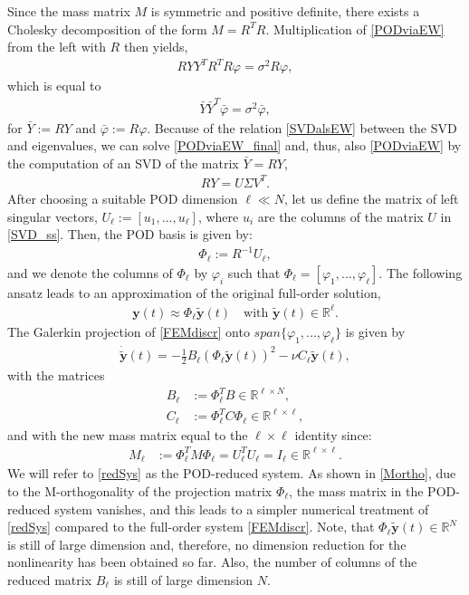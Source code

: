 Since the mass matrix $M$ is symmetric and positive definite, there exists a Cholesky decomposition of the form $M = R^T R$. Multiplication of \eqref{PODviaEW} from the left with $R$ then yields,
\begin{align*}
R Y Y^T R^T R \varphi = \sigma^2 R \varphi,
\end{align*}
which is equal to
\begin{align}
\label{PODviaEW_final}
\bar{Y} \bar{Y}^T \bar{\varphi} = \sigma^2 \bar{\varphi},
\end{align}
for $\bar{Y} := RY$ and $\bar{\varphi} := R \varphi$. Because of the relation \eqref{SVDalsEW} between the SVD and eigenvalues, we can solve \eqref{PODviaEW_final} and, thus, also \eqref{PODviaEW} by the computation of an SVD of the matrix $\bar{Y} = RY$,
\begin{align}
\label{SVD_ss}
R Y = U \Sigma V^T.
\end{align}
After choosing a suitable POD dimension $\ell \ll N$, let us define the matrix of left singular vectors, $U_{\ell} := [u_1,...,u_{\ell}]$, where $u_i$ are the columns of the matrix $U$ in \eqref{SVD_ss}. Then, the POD basis is given by:
\begin{align}
\label{Phidef}
\Phi_{\ell} := R^{-1} U_{\ell},
\end{align}
and we denote the columns of $\Phi_\ell$ by $\varphi_i$ such that $\Phi_\ell = [\varphi_1,...,\varphi_\ell]$. The following ansatz leads to an approximation of the original full-order solution,
\begin{align}
\label{PODansatz}
\mathbf{y}(t) \approx \Phi_{\ell} \mathbf{\tilde y}(t) \quad \text{with } \mathbf{\tilde y}(t) \in \mathbb{R}^{\ell}.
\end{align}
The Galerkin projection of \eqref{FEMdiscr} onto $span \{\varphi_1,...,\varphi_\ell\}$ is given by
\begin{align}
\label{redSys}
\mathbf{\dot{\tilde y}}(t) = -\frac{1}{2} B_{\ell} (\Phi_{\ell} \mathbf{\tilde y}(t))^2 - \nu C_{\ell} \mathbf{\tilde y}(t),
\end{align}
with the matrices
\begin{align}
\label{Bl}
B_{\ell} &:= \Phi_{\ell}^T B \in \mathbb{R}^{\ell \times N},\\
\label{Cl}
C_{\ell} &:= \Phi_{\ell}^T C \Phi_{\ell} \in \mathbb{R}^{\ell \times \ell},
\end{align}
and with the new mass matrix equal to the $\ell \times \ell$ identity since:
\begin{align}
\label{Mortho}
M_{\ell} &:= \Phi_{\ell}^T M \Phi_{\ell} = U_{\ell}^T U_{\ell} = I_{\ell} \in \mathbb{R}^{\ell \times \ell}.
\end{align}
We will refer to \eqref{redSys} as the POD-reduced system. As shown in \eqref{Mortho}, due to the M-orthogonality of the projection matrix $\Phi_\ell$, the mass matrix in the POD-reduced system vanishes, and this leads to a simpler numerical treatment of \eqref{redSys} compared to the full-order system \eqref{FEMdiscr}. Note, that $\Phi_\ell \mathbf{\tilde y}(t) \in \mathbb{R}^N$ is still of large dimension and, therefore, no dimension reduction for the nonlinearity has been obtained so far. Also, the number of columns of the reduced matrix $B_\ell$ is still of large dimension $N$.

